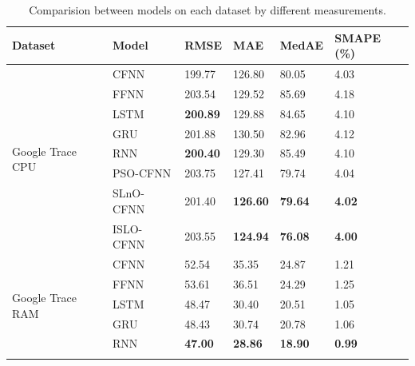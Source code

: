 \documentclass[a4paper,13pt,2p]{report}
\begin{document}
\begin{table}[!t]
\caption{Comparision between models on each dataset by different measurements.}
\label{tbl_result_app}
\centering
\begin{tabular}{|l|l|l|l|l|l|}
\hline
Dataset                              & Model     & RMSE            & MAE             & MedAE          & SMAPE (\%)    \\ \hline
\multirow{8}{*}{Google Trace CPU}    & CFNN      & 199.77          & 126.80          & 80.05          & 4.03          \\ \cline{2-6} 
                                     & FFNN      & 203.54          & 129.52          & 85.69          & 4.18          \\ \cline{2-6} 
                                     & LSTM      & \textbf{200.89} & 129.88          & 84.65          & 4.10          \\ \cline{2-6} 
                                     & GRU       & 201.88          & 130.50          & 82.96          & 4.12          \\ \cline{2-6} 
                                     & RNN       & \textbf{200.40} & 129.30          & 85.49          & 4.10          \\ \cline{2-6} 
                                     & PSO-CFNN  & 203.75          & 127.41          & 79.74          & 4.04          \\ \cline{2-6} 
                                     & SLnO-CFNN & 201.40          & \textbf{126.60} & \textbf{79.64} & \textbf{4.02} \\ \cline{2-6} 
                                     & ISLO-CFNN & 203.55          & \textbf{124.94} & \textbf{76.08} & \textbf{4.00} \\ \hline
\multirow{8}{*}{Google Trace RAM}    & CFNN      & 52.54           & 35.35           & 24.87          & 1.21          \\ \cline{2-6} 
                                     & FFNN      & 53.61           & 36.51           & 24.29          & 1.25          \\ \cline{2-6} 
                                     & LSTM      & 48.47           & 30.40           & 20.51          & 1.05          \\ \cline{2-6} 
                                     & GRU       & 48.43           & 30.74           & 20.78          & 1.06          \\ \cline{2-6} 
                                     & RNN       & \textbf{47.00}  & \textbf{28.86}  & \textbf{18.90} & \textbf{0.99} \\ \cline{2-6} 

\end{tabular}
\end{table}
\end{document}
